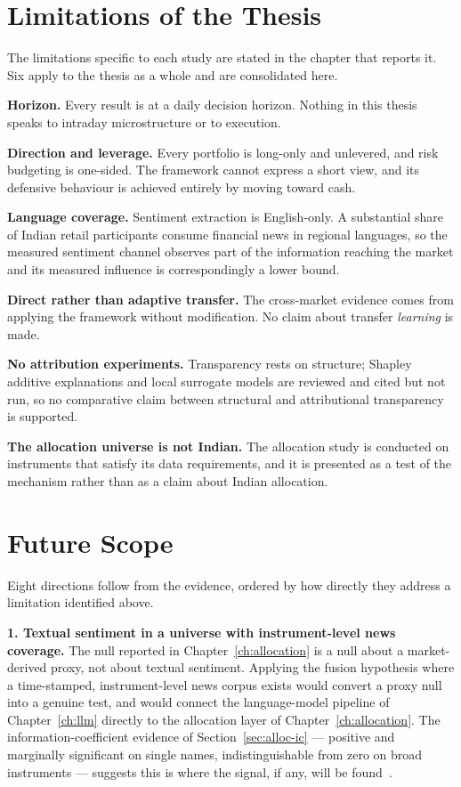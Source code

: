 \section{Limitations of the Thesis}
\label{sec:concl-limits}

The limitations specific to each study are stated in the chapter that reports it. Six apply to the
thesis as a whole and are consolidated here.

\textbf{Horizon.} Every result is at a daily decision horizon. Nothing in this thesis speaks to
intraday microstructure or to execution.

\textbf{Direction and leverage.} Every portfolio is long-only and unlevered, and risk budgeting is
one-sided. The framework cannot express a short view, and its defensive behaviour is achieved
entirely by moving toward cash.

\textbf{Language coverage.} Sentiment extraction is English-only. A substantial share of Indian
retail participants consume financial news in regional languages, so the measured sentiment channel
observes part of the information reaching the market and its measured influence is correspondingly
a lower bound.

\textbf{Direct rather than adaptive transfer.} The cross-market evidence comes from applying the
framework without modification. No claim about transfer \emph{learning} is made.

\textbf{No attribution experiments.} Transparency rests on structure; Shapley additive explanations
and local surrogate models are reviewed and cited but not run, so no comparative claim between
structural and attributional transparency is supported.

\textbf{The allocation universe is not Indian.} The allocation study is conducted on instruments
that satisfy its data requirements, and it is presented as a test of the mechanism rather than as a
claim about Indian allocation.

\section{Future Scope}
\label{sec:concl-future}

Eight directions follow from the evidence, ordered by how directly they address a limitation
identified above.

\textbf{1. Textual sentiment in a universe with instrument-level news coverage.} The null reported
in Chapter~\ref{ch:allocation} is a null about a market-derived proxy, not about textual sentiment.
Applying the fusion hypothesis where a time-stamped, instrument-level news corpus exists would
convert a proxy null into a genuine test, and would connect the language-model pipeline of
Chapter~\ref{ch:llm} directly to the allocation layer of Chapter~\ref{ch:allocation}. The
information-coefficient evidence of Section~\ref{sec:alloc-ic} --- positive and marginally
significant on single names, indistinguishable from zero on broad instruments --- suggests this is
where the signal, if any, will be found~\cite{officioso2026,liu2024llmreview}.

